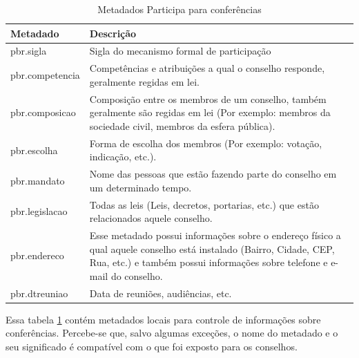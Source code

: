 \begin{table}[H]
\begin{center}
    \begin{tabular}{ | l | p{10cm} |}
    \hline
    \textbf{Metadado} & \textbf{Descrição} \\ \hline
    pbr.sigla & Sigla do mecanismo formal de participação \\ \hline
    pbr.competencia & Competências e atribuições a qual o conselho responde, geralmente regidas em lei. \\ \hline
    pbr.composicao & Composição entre os membros de um conselho, também geralmente são regidas em lei (Por exemplo: membros da sociedade civil, membros da esfera pública). \\ \hline
    pbr.escolha & Forma de escolha dos membros (Por exemplo: votação, indicação, etc.). \\ \hline
    pbr.mandato & Nome das pessoas que estão fazendo parte do conselho em um determinado tempo. \\ \hline
    pbr.legislacao & Todas as leis (Leis, decretos, portarias, etc.) que estão relacionados aquele conselho. \\ \hline
    pbr.endereco & Esse metadado possui informações sobre o endereço físico a qual aquele conselho está instalado (Bairro, Cidade, CEP, Rua, etc.) e também possui informações sobre telefone e e-mail do conselho. \\ \hline
    pbr.dtreuniao & Data de reuniões, audiências, etc. \\ \hline
    \end{tabular}
    \caption{Metadados Participa para conferências}
    \label{tab:metadata_pbr_conferencias}
\end{center}
\end{table}


Essa tabela \ref{tab:metadata_pbr_conferencias} contém metadados locais para controle de informações sobre conferências. Percebe-se que, salvo algumas exceções, o nome do metadado e o seu significado é compatível com o que foi exposto para os conselhos.

